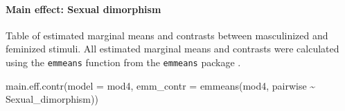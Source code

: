 \documentclass[
  bookmarksnumbered]{article}
\newenvironment{Shaded}{\begin{snugshade}}{\end{snugshade}}
\newcommand{\AttributeTok}[1]{\textcolor[rgb]{0.80,0.80,0.80}{#1}}
\newcommand{\FunctionTok}[1]{\textcolor[rgb]{0.94,0.94,0.56}{#1}}
\newcommand{\NormalTok}[1]{\textcolor[rgb]{0.80,0.80,0.80}{#1}}
\newcommand{\SpecialCharTok}[1]{\textcolor[rgb]{0.86,0.64,0.64}{#1}}
\begin{document}
\paragraph{Main effect: Sexual dimorphism}\label{main-effect-sexual-dimorphism-3}

Table of estimated marginal means and contrasts between masculinized and feminized stimuli. All estimated marginal means and contrasts were calculated using the \texttt{emmeans} function from the \texttt{emmeans} package \autocite{emmeanscit}.

\begin{Shaded}
\begin{Highlighting}[]
\FunctionTok{main.eff.contr}\NormalTok{(}\AttributeTok{model =}\NormalTok{ mod4,}
               \AttributeTok{emm\_contr =} \FunctionTok{emmeans}\NormalTok{(mod4, pairwise }\SpecialCharTok{\textasciitilde{}}\NormalTok{ Sexual\_dimorphism))}
\end{Highlighting}
\end{Shaded}

\begin{table}[H]
\centering
\caption{\label{tab:unnamed-chunk-42}Estimated marginal and constrast between Sexual dimorphism levels for the PCF model}
\centering
{}
\end{table}
\end{document}
